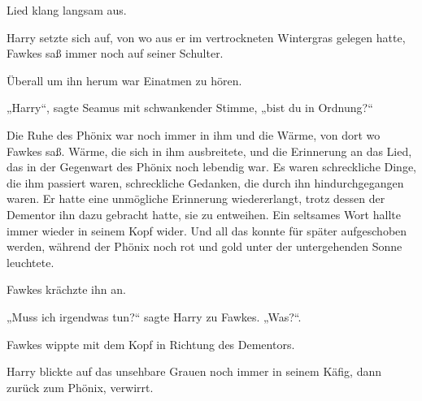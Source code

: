 
 Lied klang langsam aus.

\hplettrineextrapara
Harry setzte sich auf, von wo aus er im vertrockneten Wintergras gelegen hatte, Fawkes saß immer noch auf seiner Schulter.

Überall um ihn herum war Einatmen zu hören.

„Harry“, sagte Seamus mit schwankender Stimme, „bist du in Ordnung?“

Die Ruhe des Phönix war noch immer in ihm und die Wärme, von dort wo Fawkes saß. Wärme, die sich in ihm ausbreitete, und die Erinnerung an das Lied, das in der Gegenwart des Phönix noch lebendig war. Es waren schreckliche Dinge, die ihm passiert waren, schreckliche Gedanken, die durch ihn hindurchgegangen waren. Er hatte eine unmögliche Erinnerung wiedererlangt, trotz dessen der Dementor ihn dazu gebracht hatte, sie zu entweihen. Ein seltsames Wort hallte immer wieder in seinem Kopf wider. Und all das konnte für später aufgeschoben werden, während der Phönix noch rot und gold unter der untergehenden Sonne leuchtete.

Fawkes krächzte ihn an.

„Muss ich irgendwas tun?“ sagte Harry zu Fawkes. „Was?“.

Fawkes wippte mit dem Kopf in Richtung des Dementors.

Harry blickte auf das unsehbare Grauen noch immer in seinem Käfig, dann zurück zum Phönix, verwirrt.

